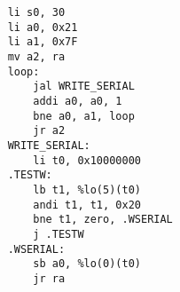 \begin{lstlisting}
    li s0, 30          
    li a0, 0x21
    li a1, 0x7F
    mv a2, ra
    loop:
        jal WRITE_SERIAL
        addi a0, a0, 1
        bne a0, a1, loop
        jr a2
    WRITE_SERIAL:                       
        li t0, 0x10000000
    .TESTW:
        lb t1, %lo(5)(t0)
        andi t1, t1, 0x20      
        bne t1, zero, .WSERIAL         
        j .TESTW                       
    .WSERIAL:
        sb a0, %lo(0)(t0)  
        jr ra
\end{lstlisting}
